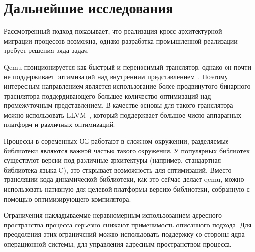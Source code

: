 \section{Дальнейшие исследования}

Рассмотренный подход показывает, что реализация кросс-архитектурной миграции процессов возможна, однако разработка промышленной реализации требует решения ряда задач.

Qemu позиционируется как быстрый и переносимый транслятор, однако он почти не поддерживает оптимизаций над внутренним представлением~\cite{TCG}. Поэтому интересным направлением является использование более продвинутого бинарного траснлятора поддердивающего большее количество оптимизаций над промежуточным представлением. В качестве основы для такого транслятора можно использовать LLVM~\cite{LLVM}, который поддержвает большое число аппаратных платформ и различных оптимизаций.

Процессы в соременных ОС работают в сложном окружении, разделяемые библиотеки являются важной частью такого окружения. У популярных библиотек существуют версии под различные архитектуры (например, стандартная библиотека языка C), это открывает возможность для оптимизаций. Вместо трансляции кода динамической библиотеки, как это сейчас делает qemu, можно использовать нативную для целевой платформы версию библиотеки, собранную с помощью оптимизирующего компилятора.

Ограничения накладываемые неравномерным использованием адресного пространства процесса серьезно снижают применимость описанного подхода. Для преодоления этих ограничений можно использовать поддержку со стороны ядра операционной системы, для управления адресным пространством процесса.
